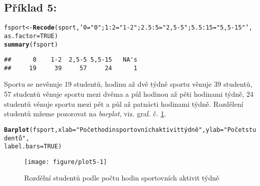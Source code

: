 \documentclass[twoside]{article}\usepackage[]{graphicx}\usepackage[]{color}
\makeatletter
\def\maxwidth{ %
  \ifdim\Gin@nat@width>\linewidth
    \linewidth
  \else
    \Gin@nat@width
  \fi
}
\newcommand{\hlnum}[1]{\textcolor[rgb]{0.686,0.059,0.569}{#1}}%
\newcommand{\hlstr}[1]{\textcolor[rgb]{0.192,0.494,0.8}{#1}}%
\newcommand{\hlstd}[1]{\textcolor[rgb]{0.345,0.345,0.345}{#1}}%
\newcommand{\hlkwb}[1]{\textcolor[rgb]{0.69,0.353,0.396}{#1}}%
\newcommand{\hlkwc}[1]{\textcolor[rgb]{0.333,0.667,0.333}{#1}}%
\newcommand{\hlkwd}[1]{\textcolor[rgb]{0.737,0.353,0.396}{\textbf{#1}}}%
\newenvironment{kframe}{%
 \def\at@end@of@kframe{}%
 \ifinner\ifhmode%
  \def\at@end@of@kframe{\end{minipage}}%
  \begin{minipage}{\columnwidth}%
 \fi\fi%
 \def\FrameCommand##1{\hskip\@totalleftmargin \hskip-\fboxsep
 \colorbox{shadecolor}{##1}\hskip-\fboxsep
     \hskip-\linewidth \hskip-\@totalleftmargin \hskip\columnwidth}%
 \MakeFramed {\advance\hsize-\width
   \@totalleftmargin\z@ \linewidth\hsize
   \@setminipage}}%
 {\par\unskip\endMakeFramed%
 \at@end@of@kframe}
\newenvironment{knitrout}{}{} %
\makeatother
\begin{document}
\subsection*{Příklad 5:}
\begin{knitrout}
\color{fgcolor}\begin{kframe}
\begin{alltt}
\hlstd{fsport} \hlkwb{<-} \hlkwd{Recode}\hlstd{(sport,} \hlstr{'0="0"; 1:2="1-2"; 2.5:5="2,5-5"; 5.5:15="5,5-15"'}\hlstd{,}
    \hlkwc{as.factor}\hlstd{=}\hlnum{TRUE}\hlstd{)}
\hlkwd{summary}\hlstd{(fsport)}
\end{alltt}
\begin{verbatim}
##      0    1-2  2,5-5 5,5-15   NA's 
##     19     39     57     24      1
\end{verbatim}
\end{kframe}
\end{knitrout}

Sportu se nevěnuje 19 studentů, hodinu až dvě týdně sportu věnuje 39 studentů, 57 studentů věnuje sportu mezi dvěma a půl hodinou až pěti hodinami týdně, 24 studentů věnuje sportu mezi pět a půl až patnácti hodinami týdně. Rozdělení studentů mžeme pozorovat na \emph{barplot}, viz. graf. č. \ref{fig:plot5}.

\begin{knitrout}
\color{fgcolor}\begin{kframe}
\begin{alltt}
\hlkwd{Barplot}\hlstd{(fsport,} \hlkwc{xlab}\hlstd{=}\hlstr{"Počet hodin sportovních aktivit týdně"}\hlstd{,} \hlkwc{ylab}\hlstd{=}\hlstr{"Počet studentů"}\hlstd{,}
    \hlkwc{label.bars}\hlstd{=}\hlnum{TRUE}\hlstd{)}
\end{alltt}
\end{kframe}\begin{figure}[h]
\texttt{[image: figure/plot5-1]} \caption[Rozdělní studentů podle počtu hodin sportovních aktivit týdně]{Rozdělní studentů podle počtu hodin sportovních aktivit týdně}\label{fig:plot5}
\end{figure}


\end{knitrout}

\newpage
\end{document}
